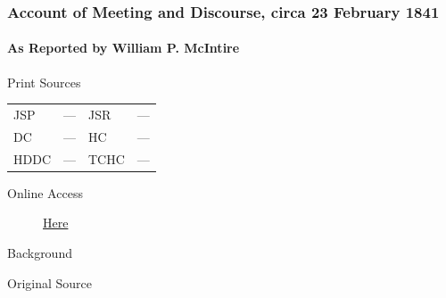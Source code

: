 		\subsubsection{Account of Meeting and Discourse, circa 23 February 1841}
			\label{EMS-1841-JS-CIR-23-FEB-1841}
			
			\paragraph{As Reported by William P. McIntire}
				\label{EMS-1841-JS-CIR-23-FEB-1841-WM}
			
				\begin{description}
					\item[Print Sources]
				\end{description}

				\begin{tabular}{p{0.5in}p{1in}p{0.5in}p{1in}}
					JSP	 	& ---		& JSR 		& --- \\
					DC	 	& ---		& HC 		& --- \\
					HDDC 	& ---		& TCHC 		& --- \\
				\end{tabular}
				
				\begin{description}
					\item[Online Access] \href{https://www.josephsmithpapers.org/paper-summary/account-of-meeting-and-discourse-circa-23february-1841/1}{Here}
				\end{description}
				
				\begin{description}
					\item[Background]
				\end{description}
				
				
				\begin{description}
					\item[Original Source]
				\end{description}
				
